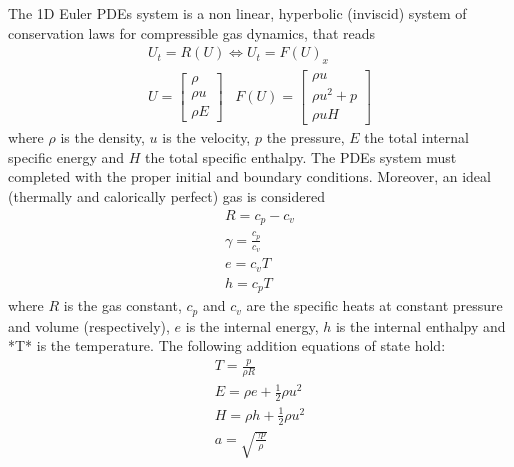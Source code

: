 The 1D Euler PDEs system is a non linear, hyperbolic (inviscid) system of conservation laws for compressible gas dynamics, that reads
\begin{equation}
\begin{matrix}
U_t = R(U)  \Leftrightarrow U_t = F(U)_x \\
U = \begin{bmatrix}
\rho \\
\rho u \\
\rho E
\end{bmatrix}\;\;\;
F(U) = \begin{bmatrix}
\rho u \\
\rho u^2 + p \\
\rho u H
\end{bmatrix}
\end{matrix}
\label{eq:euler-1D}
\end{equation}
where $\rho$ is the density, $u$ is the velocity, $p$ the pressure, $E$ the total internal specific energy and $H$ the total specific enthalpy. The PDEs system must completed with the proper initial and boundary conditions. Moreover, an ideal (thermally and calorically perfect) gas is considered
\begin{equation}
\begin{matrix}
R = c_p - c_v \\
\gamma = \frac{c_p}{c_v}\\
e = c_v T \\
h = c_p T
\end{matrix}
\end{equation}
where $R$ is the gas constant, $c_p$ and $c_v$ are the specific heats at constant pressure and volume (respectively), $e$ is the internal energy, $h$ is the internal enthalpy and *T* is the temperature. The following addition equations of state hold:
\begin{equation}
\begin{matrix}
T = \frac{p}{\rho R} \\
E = \rho e + \frac{1}{2} \rho u^2 \\
H = \rho h + \frac{1}{2} \rho u^2 \\
a = \sqrt{\frac{\gamma p}{\rho}}
\end{matrix}
\end{equation}

